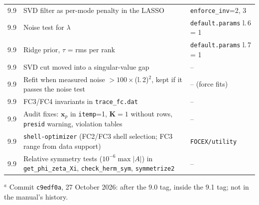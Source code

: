 \documentclass[11pt,a4paper]{article}
\newcommand{\bK}{\mathbf K}
\newcommand{\bx}{\mathbf x}
\newcommand{\code}[1]{\texttt{#1}}
\begin{document}
\begin{table}[t]
\begin{tabular}{@{}lp{7.6cm}p{4.6cm}@{}}
9.9 & SVD filter as per-mode penalty in the LASSO & \code{enforce\_inv}=2, 3\\
9.9 & Noise test for $\lambda$ & \code{default.params} l.\,6 = 1\\
9.9 & Ridge prior, $\tau$ = rms per rank & \code{default.params} l.\,7 = 1\\
9.9 & SVD cut moved into a singular-value gap & --\\
9.9 & Refit when measured noise $>100\times$(l.\,2)$^2$, kept if it passes the noise test & -- (force fits)\\
9.9 & FC3/FC4 invariants in \code{trace\_fc.dat} & --\\
9.9 & Audit fixes: $\bx_p$ in \code{itemp}=1, $\bK=1$ without rows, \code{presid} warning, violation tables & --\\
9.9 & \code{shell-optimizer} (FC2/FC3 shell selection; FC3 range from data support) & \code{FOCEX/utility}\\
9.9 & Relative symmetry tests ($10^{-6}\max|A|$) in \code{get\_phi\_zeta\_Xi}, \code{check\_herm\_sym}, \code{symmetrize2} & --\\
\bottomrule
\end{tabular}

\smallskip
\raggedright\footnotesize
$^a$ Commit \code{c9edf0a}, 27 October 2026: after the 9.0 tag, inside the 9.1 tag; not in the manual's history.
\end{table}
\end{document}
